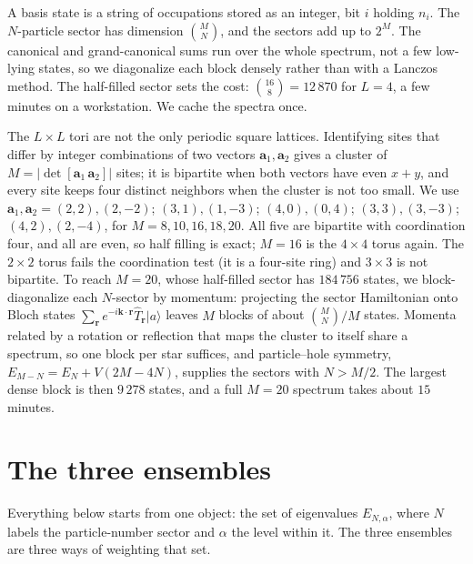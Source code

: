 \documentclass[twocolumn,10pt]{article}
\begin{document}
A basis state is a string of occupations stored as an integer, bit $i$ holding
$n_i$. The $N$-particle sector has dimension $\binom{M}{N}$, and the sectors add
up to $2^M$. The canonical and grand-canonical sums run over the whole spectrum,
not a few low-lying states, so we diagonalize each block densely rather than with
a Lanczos method. The half-filled sector sets the cost: $\binom{16}{8}=12\,870$
for $L=4$, a few minutes on a workstation. We cache the spectra once.

The $L\times L$ tori are not the only periodic square lattices. Identifying sites
that differ by integer combinations of two vectors $\mathbf a_1,\mathbf a_2$
gives a cluster of $M=|\det[\mathbf a_1\,\mathbf a_2]|$ sites; it is bipartite
when both vectors have even $x+y$, and every site keeps four distinct neighbors
when the cluster is not too small. We use $\mathbf a_1,\mathbf a_2=(2,2),(2,-2)$;
$(3,1),(1,-3)$; $(4,0),(0,4)$; $(3,3),(3,-3)$; $(4,2),(2,-4)$, for
$M=8,10,16,18,20$. All five are bipartite with coordination four, and all are
even, so half filling is exact; $M=16$ is the $4\times4$ torus again. The $2\times2$
torus fails the coordination test (it is a four-site ring) and $3\times3$ is not
bipartite. To reach $M=20$, whose half-filled sector has $184\,756$ states, we
block-diagonalize each $N$-sector by momentum: projecting the sector Hamiltonian
onto Bloch states $\sum_{\mathbf r}e^{-i\mathbf k\cdot\mathbf r}\hat T_{\mathbf
r}|a\rangle$ leaves $M$ blocks of about $\binom MN/M$ states. Momenta related by
a rotation or reflection that maps the cluster to itself share a spectrum, so one
block per star suffices, and particle--hole symmetry, $E_{M-N}=E_N+V(2M-4N)$,
supplies the sectors with $N>M/2$. The largest dense block is then $9\,278$
states, and a full $M=20$ spectrum takes about $15$ minutes.

\section{The three ensembles}
Everything below starts from one object: the set of eigenvalues $E_{N,\alpha}$,
where $N$ labels the particle-number sector and $\alpha$ the level within it. The
three ensembles are three ways of weighting that set.
\end{document}
